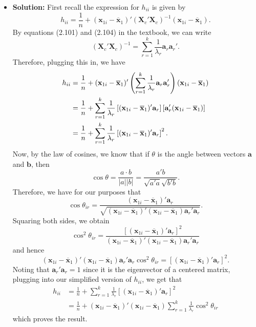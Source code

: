 \documentclass[11pt]{article}
\begin{document}
\begin{itemize}
\item[] \textbf{Solution:}  First recall the expression for $h_{ii}$ is given by
\[
h_{ii} = \frac{1}{n} + (\mathbf{x}_{1i} - \overline{\mathbf{x}}_1)'(\mathbf{X}_c'\mathbf{X}_c)^{-1}(\mathbf{x}_{1i} - \overline{\mathbf{x}}_1).
\]
By equations (2.101) and (2.104) in the textbook, we can write
\[
(\mathbf{X}_c'\mathbf{X}_c)^{-1} = \sum_{r=1}^k \frac{1}{\lambda_r}\mathbf{a}_r\mathbf{a}_r'.
\]
Therefore, plugging this in, we have
\begin{align*}
h_{ii} &= \frac{1}{n} + ({\bf x}_{1i} - \overline{\mathbf{x}}_1)'\left(\sum_{r=1}^k \frac{1}{\lambda_r}\mathbf{a}_r\mathbf{a}_r'\right)({\bf x}_{1i} - \overline{\mathbf{x}}_1) \\
&= \frac{1}{n} + \sum_{r=1}^k \frac{1}{\lambda_r}\left[(\mathbf{x}_{1i}-\overline{\mathbf{x}}_1)'\mathbf{a}_r\right]\left[\mathbf{a}_r'(\mathbf{x}_{1i}-\overline{\mathbf{x}}_1)\right] \\
&= \frac{1}{n} + \sum_{r=1}^k \frac{1}{\lambda_r}\left[(\mathbf{x}_{1i}-\overline{\mathbf{x}}_1)'\mathbf{a}_r\right]^2.
\end{align*}
Now, by the law of cosines, we know that if $\theta$ is the angle between vectors $\mathbf{a}$ and $\mathbf{b}$, then
\[
\cos\theta = \frac{a\cdot b}{|a||b|} = \frac{a'b}{\sqrt{a'a}\sqrt{b'b}}.
\]
Therefore, we have for our purposes that
\[
\cos\theta_{ir} = \frac{(\mathbf{x}_{1i}-\overline{\mathbf{x}}_1)'\mathbf{a}_r}{\sqrt{(\mathbf{x}_{1i}-\overline{\mathbf{x}}_1)'(\mathbf{x}_{1i}-\overline{\mathbf{x}}_1)\mathbf{a}_r'\mathbf{a}_r}}.
\]
Squaring both sides, we obtain
\[
\cos^2\theta_{ir} = \frac{\left[(\mathbf{x}_{1i}-\overline{\mathbf{x}}_1)'\mathbf{a}_r\right]^2}{(\mathbf{x}_{1i}-\overline{\mathbf{x}}_1)'(\mathbf{x}_{1i}-\overline{\mathbf{x}}_1)\mathbf{a}_r'\mathbf{a}_r}
\]
and hence
\[
(\mathbf{x}_{1i}-\overline{\mathbf{x}}_1)'(\mathbf{x}_{1i}-\overline{\mathbf{x}}_1)\mathbf{a}_r'\mathbf{a}_r\cos^2\theta_{ir} = \left[(\mathbf{x}_{1i}-\overline{\mathbf{x}}_1)'\mathbf{a}_r\right]^2.
\]
Noting that $\mathbf{a}_r'\mathbf{a}_r = 1$ since it is the eigenvector of a centered matrix, plugging into our simplified version of $h_{ii}$, we get that
\begin{align*}
h_{ii} &= \frac{1}{n} + \sum_{r=1}^k \frac{1}{\lambda_r}\left[(\mathbf{x}_{1i}-\overline{\mathbf{x}}_1)'\mathbf{a}_r\right]^2 \\
&= \frac{1}{n} + (\mathbf{x}_{1i}-\overline{\mathbf{x}}_1)'(\mathbf{x}_{1i}-\overline{\mathbf{x}}_1)\sum_{r=1}^k \frac{1}{\lambda_r} \cos^2\theta_{ir}
\end{align*}
which proves the result.
\end{itemize}
\end{document}

